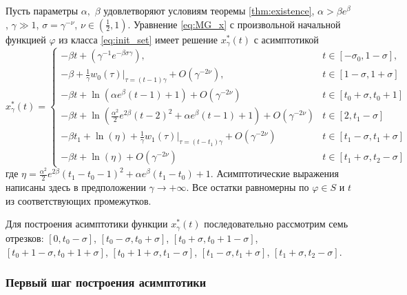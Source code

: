 \begin{theorem}
\label{thm:th_asymp}
Пусть параметры $\alpha,$ $\beta$ удовлетворяют условиям теоремы \ref{thm:existence}, $\alpha > \beta e^{\beta}$, $\gamma \gg 1$, $\sigma = \gamma^{-\nu}$, $\nu \in (\frac{1}{2}, 1)$. Уравнение \eqref{eq:MG_x} с произвольной начальной функцией $\varphi$ из класса \eqref{eq:init_set} имеет решение $x_\gamma^*(t)$ с асимптотикой
\footnotesize
\begin{equation}
	\label{eq:sol_x*gamma}
	x^*_\gamma(t)= 
	\begin{cases}
		- \beta t + (\gamma^{-1} e^{-\beta \sigma \gamma}), & t\in[-\sigma_0, 1 - \sigma],\\
		-\beta + \frac{1}{\gamma} w_0(\tau)|_{\tau=(t - 1)\gamma} + O(\gamma^{-2\nu}), & t \in [1 - \sigma,1 + \sigma]\\
		- \beta t + \ln(\alpha e^{\beta}(t - 1) + 1) + O(\gamma^{-2\nu}) & t\in[t_0 + \sigma, t_0 + 1]\\
		- \beta t + \ln(\frac{\alpha^2}{2}e^{2 \beta}(t - 2)^2 + \alpha e^{\beta}(t - 1) + 1) + O(\gamma^{-2\nu}) & t \in [2, t_1 - \sigma]\\
		- \beta t_1 + \ln(\eta)+\frac{1}{\gamma} w_1(\tau)|_{\tau=(t - t_1)\gamma} + O(\gamma^{-2\nu}) & t\in[t_1 - \sigma, t_1  +\sigma]\\
		- \beta t + \ln(\eta) + O(\gamma^{-2\nu}) & t \in [t_1 + \sigma, t_2 - \sigma]
	\end{cases}
\end{equation}
\normalsize
где $\eta=\frac{\alpha^2}{2}e^{2\beta}(t_1 - t_0 - 1)^2 + \alpha e^{\beta}(t_1 - t_0) + 1$.
Асимптотические выражения написаны здесь в предположении $\gamma\to+\infty$.
Все остатки равномерны по $\varphi \in S$ и $t$ из соответствующих промежутков.
\end{theorem}

Для построения асимптотики функции $x_\gamma^*(t)$ последовательно рассмотрим семь отрезков:
$[0, t_0 - \sigma]$, 
$[t_0  -\sigma, t_0 + \sigma]$,
$[t_0 + \sigma, t_0 + 1 - \sigma]$,
$[t_0 + 1 - \sigma, t_0 + 1 + \sigma]$,
$[t_0 + 1 + \sigma, t_1 - \sigma]$,
$[t_1 - \sigma, t_1 + \sigma]$,
$[t_1 + \sigma, t_2 - \sigma]$.

\subsubsection{Первый шаг построения асимптотики}

